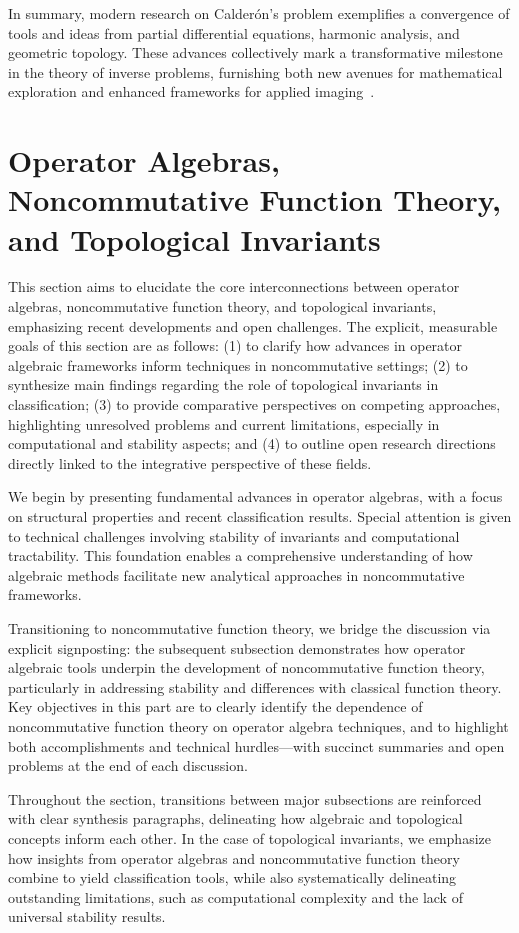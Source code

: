 \documentclass[sigconf]{acmart}
\begin{document}
In summary, modern research on Calderón's problem exemplifies a convergence of tools and ideas from partial differential equations, harmonic analysis, and geometric topology. These advances collectively mark a transformative milestone in the theory of inverse problems, furnishing both new avenues for mathematical exploration and enhanced frameworks for applied imaging~\cite{ref102}.

\section{Operator Algebras, Noncommutative Function Theory, and Topological Invariants}
This section aims to elucidate the core interconnections between operator algebras, noncommutative function theory, and topological invariants, emphasizing recent developments and open challenges. The explicit, measurable goals of this section are as follows: (1) to clarify how advances in operator algebraic frameworks inform techniques in noncommutative settings; (2) to synthesize main findings regarding the role of topological invariants in classification; (3) to provide comparative perspectives on competing approaches, highlighting unresolved problems and current limitations, especially in computational and stability aspects; and (4) to outline open research directions directly linked to the integrative perspective of these fields.

We begin by presenting fundamental advances in operator algebras, with a focus on structural properties and recent classification results. Special attention is given to technical challenges involving stability of invariants and computational tractability. This foundation enables a comprehensive understanding of how algebraic methods facilitate new analytical approaches in noncommutative frameworks.

Transitioning to noncommutative function theory, we bridge the discussion via explicit signposting: the subsequent subsection demonstrates how operator algebraic tools underpin the development of noncommutative function theory, particularly in addressing stability and differences with classical function theory. Key objectives in this part are to clearly identify the dependence of noncommutative function theory on operator algebra techniques, and to highlight both accomplishments and technical hurdles---with succinct summaries and open problems at the end of each discussion.

Throughout the section, transitions between major subsections are reinforced with clear synthesis paragraphs, delineating how algebraic and topological concepts inform each other. In the case of topological invariants, we emphasize how insights from operator algebras and noncommutative function theory combine to yield classification tools, while also systematically delineating outstanding limitations, such as computational complexity and the lack of universal stability results.
\end{document}
